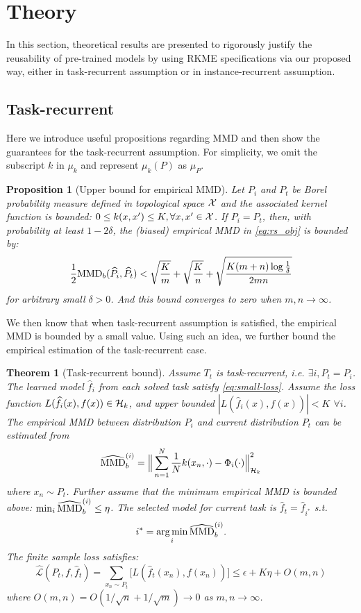 \documentclass[paper=letter, fontsize=20pt]{article}
\newcommand*\argmin{\mathop{\arg \min}}
\newtheorem{Theorem}{Theorem}
\newtheorem{Proposition}{Proposition}
\begin{document}
\section{Theory}
In this section, theoretical results are presented to rigorously justify the reusability of pre-trained models by using RKME specifications via our proposed way, either in task-recurrent assumption or in instance-recurrent assumption.

\subsection{Task-recurrent}
Here we introduce useful propositions regarding MMD and then show the guarantees for the task-recurrent assumption. For simplicity, we omit the subscript $k$ in $\mu_k$ and represent $\mu_k(P)$ as $\mu_P$.

\begin{Proposition}[Upper bound for empirical MMD]\label{prop:mmd-bound}
\textnormal{\cite[Theorem 7]{gretton2012kernel}} Let $P_i$ and $P_t$ be Borel probability measure defined in topological space $\mathcal{X}$ and the associated kernel function is bounded: $0\leq k(x,x')\leq K, \forall x,x'\in \mathcal{X}$. If $P_i = P_t$, then, with probability at least $1-2\delta$, the (biased) empirical \textnormal{MMD} in \eqref{eq:rs_obj} is bounded by:
\[
\frac{1}{2}\textnormal{MMD}_b(\widehat{P_i}, \widehat{P_t}) < \sqrt{\frac{K}{m}}+ \sqrt{\frac{K}{n}} +\sqrt{\frac{K(m+n)\log \frac{1}{\delta}}{2mn}}
\]
for arbitrary small $\delta>0$. And this bound converges to zero when $m,n\to \infty$.
\end{Proposition}

We then know that when task-recurrent assumption is satisfied, the empirical MMD is bounded by a small value. Using such an idea, we further bound the empirical estimation of the task-recurrent case.

\begin{Theorem}[Task-recurrent bound]\label{thm:task-recurrent} Assume $T_t$ is task-recurrent, i.e. $\exists i, P_t = P_i$. The learned model $\widehat{f}_i$ from each solved task satisfy 
\eqref{eq:small-loss}.
Assume the loss function $L(\widehat{f}_i(x),f(x)) \in \mathcal{H}_k$, and upper bounded $|L(\widehat{f}_i(x),f(x))|<K$ $\forall i$. The empirical \textnormal{MMD} between distribution $P_i$ and current distribution $P_t$ can be estimated from
\[
\widehat{\textnormal{MMD}}_b^{(i)} = \Big\lVert\sum_{n=1}^{N}\frac{1}{N} k(x_n,\cdot)-\Phi_i(\cdot) \Big\rVert_{\mathcal{H}_k}^2    
\]
where $x_n\sim P_t$.
Further assume that the minimum empirical \textnormal{MMD}  is bounded above: 
$\min_i \widehat{\textnormal{MMD}}_b^{(i)} \leq \eta$. 
The selected model for current task is
$\widehat{f}_t = \widehat{f}_{i^*}$ s.t.
\[
i^{\ast}=\argmin_i \widehat{\textnormal{MMD}}_b^{(i)}.
\]
The finite sample loss satisfies:
\begin{equation}\label{eq:task-recurrent-bound}
   \widehat{\mathcal{L}}(P_t,f,\widehat{f}_t)=\sum_{x_n\sim P_t }\big[L(\widehat{f}_t(x_n),f(x_n))\big]\leq \epsilon + K\eta + O(m,n)
\end{equation}
where $O(m,n)=O(1/\sqrt{n}+1/\sqrt{m}) \to 0$ as $m,n \to \infty$. 
\end{Theorem}
\end{document}

